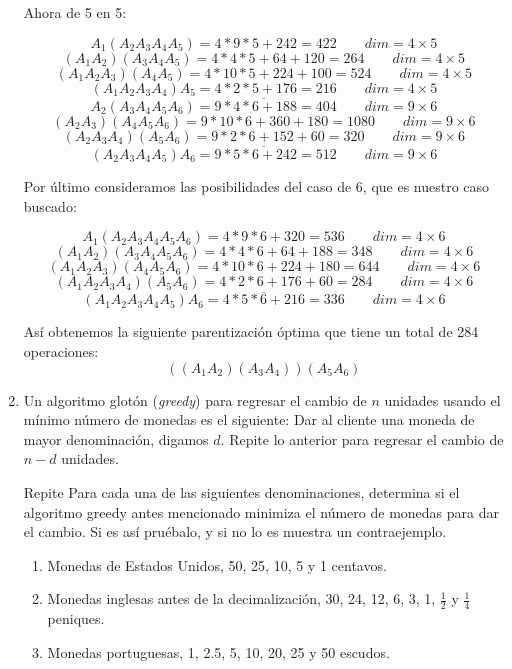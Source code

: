 \documentclass[11pt,letterpaper]{article}
\begin{document}
\begin{enumerate}[leftmargin=*]
    Ahora de 5 en 5:

    \[ A_1(A_2A_3A_4A_5) = 4*9*5+242 = 422 \qquad dim = 4\times5 \]    
    \[ (A_1A_2)(A_3A_4A_5) = 4*4*5+64+120 = 264 \qquad dim = 4\times5 \]  
    \[ (A_1A_2A_3)(A_4A_5) = 4*10*5+224+100 = 524 \qquad dim = 4\times5 \]  
    \[ \underline{(A_1A_2A_3A_4)A_5 = 4*2*5+176 = 216 \qquad dim = 4\times5} \]  
    \[ A_2(A_3A_4A_5A_6) = 9*4*6+188 = 404 \qquad dim = 9\times6 \]    
    \[ (A_2A_3)(A_4A_5A_6) = 9*10*6+360+180 = 1080 \qquad dim = 9\times6 \]    
    \[ \underline{(A_2A_3A_4)(A_5A_6) = 9*2*6+152+60 = 320 \qquad dim = 9\times6} \]    
    \[ (A_2A_3A_4A_5)A_6 = 9*5*6+242 = 512 \qquad dim = 9\times6 \]    

    Por último consideramos las posibilidades del caso de 6, que es nuestro caso buscado:

    \[ A_1(A_2A_3A_4A_5A_6) = 4*9*6+320 = 536 \qquad dim = 4\times6 \]
    \[ (A_1A_2)(A_3A_4A_5A_6) = 4*4*6+64+188 = 348 \qquad dim = 4\times6 \]
    \[ (A_1A_2A_3)(A_4A_5A_6) = 4*10*6+224+180 = 644 \qquad dim = 4\times6 \]
    \[ \underline{(A_1A_2A_3A_4)(A_5A_6) = 4*2*6+176+60 = 284 \qquad dim = 4\times6} \]
    \[ (A_1A_2A_3A_4A_5)A_6 = 4*5*6+216 = 336 \qquad dim = 4\times6 \]

    Así obtenemos la siguiente parentización óptima que tiene un total de 284 operaciones:
    \[ ((A_1A_2)(A_3A_4))(A_5A_6) \]

    \item Un algoritmo glotón (\textit{greedy}) para regresar el cambio de $n$ unidades usando el mínimo número de monedas es el siguiente: Dar al cliente una moneda de mayor denominación, digamos $d$. Repite lo anterior para regresar el cambio de $n - d$ unidades.
    
    Repite Para cada una de las siguientes denominaciones, determina si el algoritmo greedy antes mencionado minimiza el número de monedas para dar el cambio. Si es así pruébalo, y si no lo es muestra un contraejemplo.
    
    \begin{enumerate}[label=\alph*)]
        \item Monedas de Estados Unidos, 50, 25, 10, 5 y 1 centavos.
        
        \item Monedas inglesas antes de la decimalización, 30, 24, 12, 6, 3, 1, $\frac{1}{2}$ y $\frac{1}{4}$ peniques.
        
        \item Monedas portuguesas, 1, 2.5, 5, 10, 20, 25 y 50 escudos.
        

\end{enumerate}
\end{enumerate}
\end{document}
